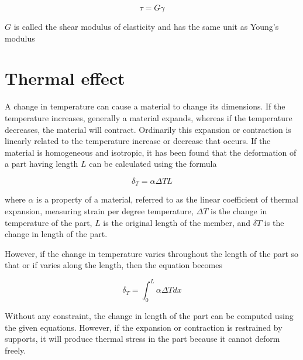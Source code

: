 \documentclass[
10pt,
a4paper,
openany,
svgnames,
]{book}
\begin{document}
\begin{equation}
  \tau  = G\gamma
\end{equation}

$G$ is called the shear modulus of elasticity and has the same unit as Young’s modulus

\section{Thermal effect}

A change in temperature can cause a material to change its dimensions. If the temperature increases, generally a material expands, whereas if the temperature decreases, the material will contract. Ordinarily this expansion or contraction is linearly related to the temperature increase or decrease that occurs. If the material is homogeneous and isotropic, it has been found that the deformation of a part having length $L$ can be calculated using the formula

\begin{equation}
  \delta _T = \alpha \Delta TL
\end{equation}

where $\alpha$ is a property of a material, referred to as the linear coefficient of thermal expansion, measuring strain per degree temperature, $\Delta T$ is the change in temperature of the part, $L$ is the original length of the member, and $\delta T$ is the change in length of the part.

However, if the change in temperature varies throughout the length of the part so that or if varies along the length, then the equation becomes

\begin{equation}
  \delta _T = \int_0^L \alpha \Delta Tdx
\end{equation}

Without any constraint, the change in length of the part can be computed using the given equations. However, if the expansion or contraction is restrained by supports, it will produce thermal stress in the part because it cannot deform freely.
  
\end{document}
